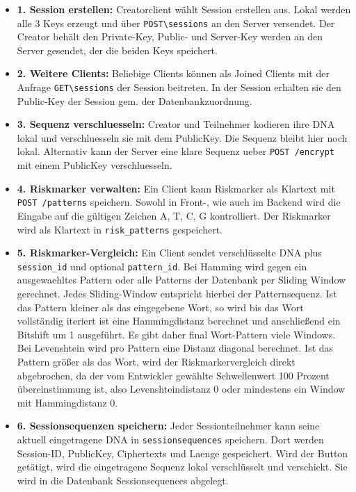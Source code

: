 \begin{itemize}
\item
\textbf{1. Session erstellen: } Creatorclient wählt Session erstellen aus. Lokal werden alle 3 Keys erzeugt und über \texttt{POST\textbackslash sessions} an den Server versendet. Der Creator behält den Private-Key, Public- und Server-Key werden an den Server gesendet, der die beiden Keys speichert. 

\item
\textbf{2. Weitere Clients: } Beliebige Clients können als Joined Clients mit der Anfrage \texttt{GET\textbackslash sessions} der Session beitreten. In der Session erhalten sie den Public-Key der Session gem. der Datenbankzuordnung. 

\item
  \textbf{3. Sequenz verschluesseln:} Creator und Teilnehmer kodieren ihre
  DNA lokal und verschluesseln sie mit dem PublicKey. Die Sequenz bleibt hier noch lokal. Alternativ kann der Server eine klare Sequenz ueber \texttt{POST\ /encrypt} mit einem
  PublicKey verschluesseln.
\item
  \textbf{4. Riskmarker verwalten:} Ein Client kann Riskmarker als Klartext
  mit \texttt{POST\ /patterns} speichern. Sowohl in Front-, wie auch im Backend wird die Eingabe auf die gültigen Zeichen A, T, C, G kontrolliert. Der Riskmarker wird als Klartext in \texttt{risk\_patterns} gespeichert.
\item
  \textbf{5. Riskmarker-Vergleich:} Ein Client sendet verschlüsselte DNA
  plus \texttt{session\_id} und optional \texttt{pattern\_id}. Bei
  Hamming wird gegen ein ausgewaehltes Pattern oder alle Patterns der Datenbank per Sliding Window gerechnet. Jedes Sliding-Window entspricht hierbei der Patternsequenz. Ist das Pattern kleiner als das eingegebene Wort, so wird bis das Wort vollständig iteriert ist eine Hammingdistanz berechnet und anschließend ein Bitshift um 1 ausgeführt. Es gibt daher final Wort-Pattern viele Windows. Bei Levenshtein wird pro Pattern eine Distanz diagonal berechnet. Ist das Pattern größer als das Wort, wird der Riskmarkervergleich direkt abgebrochen, da der vom Entwickler gewählte Schwellenwert 100 Prozent übereinstimmung ist, also Levenshteindistanz 0 oder mindestens ein Window mit Hammingdistanz 0.
\item
  \textbf{6. Sessionsequenzen speichern:} Jeder Sessionteilnehmer kann
  seine aktuell eingetragene DNA in \texttt{sessionsequences}
  speichern. Dort werden Session-ID, PublicKey, Ciphertexts und Laenge
  gespeichert. Wird der Button getätigt, wird die eingetragene Sequenz lokal verschlüsselt und verschickt. Sie wird in die Datenbank Sessionsequences abgelegt. 

\end{itemize}
